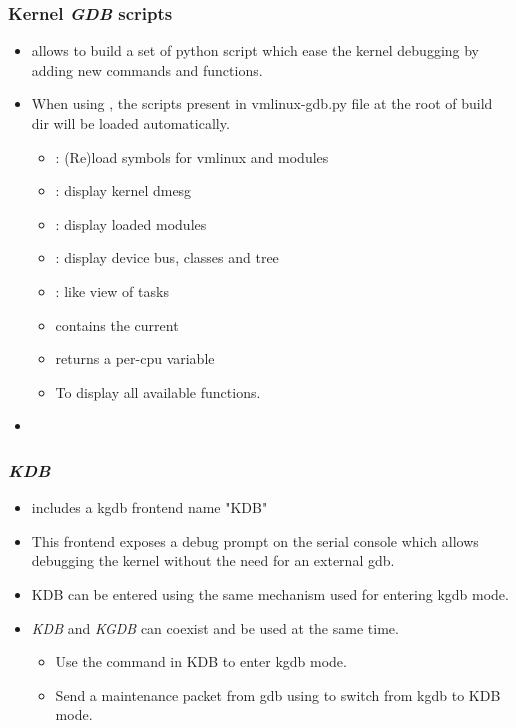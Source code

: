 \begin{frame}
  \frametitle{Kernel {\em GDB} scripts}
  \begin{itemize}
    \item {} allows to build a set of python script
          which ease the kernel debugging by adding new commands and functions.
    \item When using , the scripts present in vmlinux-gdb.py
          file at the root of build dir will be loaded automatically.
    \begin{itemize}
      \item {}: (Re)load symbols for vmlinux and modules
      \item {}: display kernel dmesg
      \item {}: display loaded modules
      \item {}: display device bus, classes and
            tree
      \item {}:  like view of tasks
      \item {} contains the current 
      \item {} returns a per-cpu variable
      \item {} To display all available functions.
    \end{itemize}
    \item {}
  \end{itemize}
\end{frame}

\begin{frame}
  \frametitle{{\em KDB}}
  \begin{itemize}
    \item {} includes a kgdb frontend name "KDB"
    \item This frontend exposes a debug prompt on the serial console which
          allows debugging the kernel without the need for an external gdb.
    \item KDB can be entered using the same mechanism used for entering kgdb
          mode.
    \item {\em KDB} and {\em KGDB} can coexist and be used at the same time.
    \begin{itemize}
      \item Use the  command in KDB to enter kgdb mode.
      \item Send a maintenance packet from gdb using 
            to switch from kgdb to KDB mode.
    \end{itemize}
  \end{itemize}
\end{frame}

